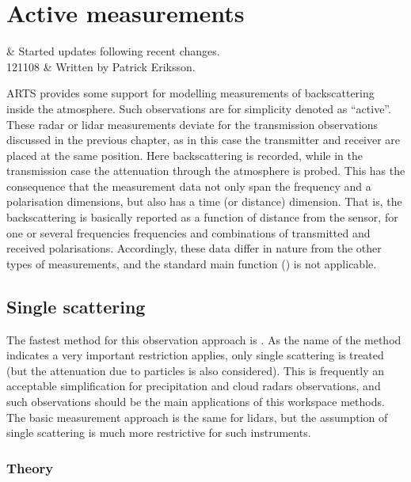 \chapter{Active measurements}
 \label{sec:cradar}


 & Started updates following recent changes.\\
 121108 & Written by Patrick Eriksson.\\
\stophistory

ARTS provides some support for modelling measurements of backscattering inside
the atmosphere. Such observations are for simplicity denoted as ``active''.
These radar or lidar measurements deviate for the transmission observations
discussed in the previous chapter, as in this case the transmitter and receiver
are placed at the same position. Here backscattering is recorded, while in the
transmission case the attenuation through the atmosphere is probed. This has
the consequence that the measurement data not only span the frequency and a
polarisation dimensions, but also has a time (or distance) dimension. That is,
the backscattering is basically reported as a function of distance from the
sensor, for one or several frequencies frequencies and combinations of
transmitted and received polarisations. Accordingly, these data differ in
nature from the other types of measurements, and the standard main function
() is not applicable.



\section{Single scattering}
\label{sec:cradar:single}

The fastest method for this observation approach is
. As the name of the method indicates a very
important restriction applies, only single scattering is treated (but the
attenuation due to particles is also considered). This is frequently an
acceptable simplification for precipitation and cloud radars observations, and
such observations should be the main applications of this workspace methods.
The basic measurement approach is the same for lidars, but the assumption of
single scattering is much more restrictive for such instruments.

\subsection{Theory}
\label{sec:cradar:theory}

